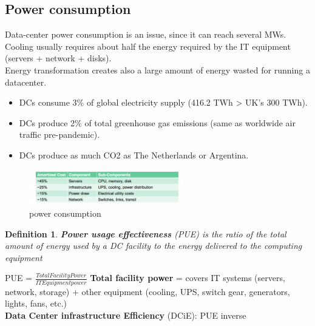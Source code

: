 \documentclass[10pt, oneside]{article}
\newtheorem{defn}{Definition}
\begin{document}
\subsection{Power consumption}
Data-center power consumption is an issue, since it can reach several MWs.\\
Cooling usually requires about half the energy required by the IT equipment (servers + network + disks).\\
Energy transformation creates also a large amount of energy wasted for running a datacenter.\\
\begin{itemize}
    \item DCs consume 3\% of global electricity supply (416.2 TWh > UK’s 300 TWh).
    \item DCs produce 2\% of total greenhouse gas emissions (same as worldwide air traffic pre-pandemic).
    \item DCs produce as much CO2 as The Netherlands or Argentina.
\end{itemize}
\begin{figure}[H]
    \begin{center}
    \includegraphics[width=0.6\textwidth]{img/img29.png}
    \caption{power consumption}
    \label{fig:power consumption}
    \end{center}
\end{figure}
\begin{defn}
    {\bf Power usage effectiveness} (PUE) is the ratio of the total amount of energy used by a DC facility to the energy delivered to the computing equipment
\end{defn}
PUE = $\frac{Total Facility Power}{IT Equipment power}$ 
\newline\newline
{\bf Total facility power} = covers IT systems (servers, network, storage) + other equipment (cooling, UPS, switch gear, generators, lights, fans, etc.)\\
{\bf Data Center infrastructure Efficiency} (DCiE): PUE inverse
\newline\newline
\end{document}
